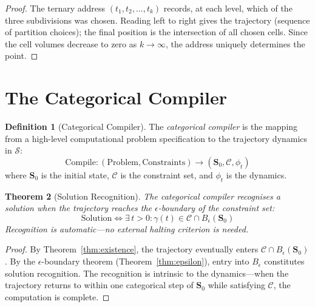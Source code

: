 \documentclass[twocolumn,10pt,a4paper]{article}
\theoremstyle{plain}
\newtheorem{theorem}{Theorem}[section]
\theoremstyle{definition}
\newtheorem{definition}[theorem]{Definition}
\theoremstyle{remark}
\newcommand{\Sspace}{\mathcal{S}}
\newcommand{\Scoord}{\mathbf{S}}
\newcommand{\trajectory}{\gamma}
\begin{document}
\begin{proof}
The ternary address $(t_1, t_2, \ldots, t_k)$ records, at each level, which of the three subdivisions was chosen. Reading left to right gives the trajectory (sequence of partition choices); the final position is the intersection of all chosen cells. Since the cell volumes decrease to zero as $k \to \infty$, the address uniquely determines the point.
\end{proof}

\section{The Categorical Compiler}
\label{sec:compiler}

\begin{definition}[Categorical Compiler]
\label{def:compiler}
The \emph{categorical compiler} is the mapping from a high-level computational problem specification to the trajectory dynamics in $\Sspace$:
\begin{equation}
    \mathrm{Compile} : (\text{Problem}, \text{Constraints}) \to (\Scoord_0, \mathcal{C}, \phi_t)
\end{equation}
where $\Scoord_0$ is the initial state, $\mathcal{C}$ is the constraint set, and $\phi_t$ is the dynamics.
\end{definition}

\begin{theorem}[Solution Recognition]
\label{thm:recognition}
The categorical compiler recognises a solution when the trajectory reaches the $\epsilon$-boundary of the constraint set:
\begin{equation}
    \text{Solution} \iff \exists\, t > 0 : \trajectory(t) \in \mathcal{C} \cap B_\epsilon(\Scoord_0)
\end{equation}
Recognition is automatic---no external halting criterion is needed.
\end{theorem}

\begin{proof}
By Theorem~\ref{thm:existence}, the trajectory eventually enters $\mathcal{C} \cap B_\epsilon(\Scoord_0)$. By the $\epsilon$-boundary theorem (Theorem~\ref{thm:epsilon}), entry into $B_\epsilon$ constitutes solution recognition. The recognition is intrinsic to the dynamics---when the trajectory returns to within one categorical step of $\Scoord_0$ while satisfying $\mathcal{C}$, the computation is complete.
\end{proof}
\end{document}
